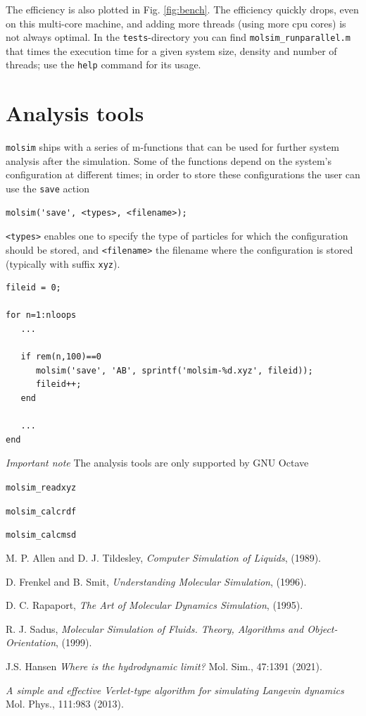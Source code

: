 \documentclass[11pt]{article}
\begin{document}
The efficiency is also plotted in Fig. \ref{fig:bench}. The efficiency quickly
drops, even on this multi-core machine, and adding more threads (using more cpu
cores) is not always optimal. In the \verb!tests!-directory you can find
\verb!molsim_runparallel.m! that times the execution time for a given system
size, density and number of threads; use the \verb!help! command for its usage.

\section{Analysis tools} 
\verb!molsim! ships with a series of m-functions that can be used
for further system analysis after the simulation. Some of the functions depend on the
system's configuration at different times; in order to store these configurations the user can
use the \verb!save! action
\begin{verbatim}
molsim('save', <types>, <filename>); 
\end{verbatim}
\verb!<types>! enables one to specify the type of particles for which the configuration
should be stored, and \verb!<filename>! the filename where the
configuration is stored (typically with suffix \verb!xyz!). 

\begin{verbatim}
fileid = 0;

for n=1:nloops
   ...

   if rem(n,100)==0
      molsim('save', 'AB', sprintf('molsim-%d.xyz', fileid));
      fileid++;
   end

   ...
end
\end{verbatim}

\textit{Important note} The analysis tools are only supported by GNU Octave

\noindent \verb!molsim_readxyz!

\noindent \verb!molsim_calcrdf!

\noindent \verb!molsim_calcmsd!

\noindent 



\clearpage

\begin{thebibliography}{9}

  M. P. Allen and D. J. Tildesley, \emph{Computer Simulation of Liquids}, (1989). 

  D. Frenkel and B. Smit, \emph{Understanding Molecular Simulation}, (1996).

 D. C. Rapaport, \emph{The Art of Molecular Dynamics Simulation}, (1995).

  R. J. Sadus, \emph{Molecular Simulation of Fluids. Theory, Algorithms and
    Object-Orientation}, (1999).

  J.S. Hansen \emph{Where is the hydrodynamic limit?} Mol. Sim., 47:1391 (2021).
 
   \emph{A simple and effective Verlet-type algorithm for simulating Langevin dynamics} 
   Mol. Phys., 111:983 (2013).
  
\end{thebibliography}
\end{document}
